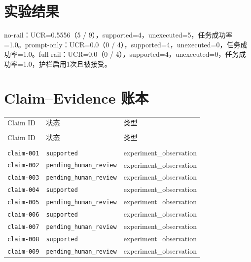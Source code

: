 \documentclass[UTF8]{ctexart}
\begin{document}
\section{实验结果}
no-\allowbreak{}rail：UCR=0.5556（5 / 9），supported=4，unexecuted=5，任务成功率=1.0。prompt-\allowbreak{}only：UCR=0.0（0 / 4），supported=4，unexecuted=0，任务成功率=1.0。full-\allowbreak{}rail：UCR=0.0（0 / 4），supported=4，unexecuted=0，任务成功率=1.0，护栏启用1次且被接受。
\section{Claim--Evidence 账本}
\begin{longtable}{@{}>{\raggedright\arraybackslash}p{}>{\raggedright\arraybackslash}p{}>{\raggedright\arraybackslash}p{}@{}}
\toprule
Claim ID & 状态 & 类型\\\\
\midrule
\endfirsthead
\toprule
Claim ID & 状态 & 类型\\\\
\midrule
\endhead
\texttt{\scriptsize claim-\allowbreak{}001} & \texttt{\scriptsize supported} & experiment\_\allowbreak{}observation \\
\texttt{\scriptsize claim-\allowbreak{}002} & \texttt{\scriptsize pending\_\allowbreak{}human\_\allowbreak{}review} & experiment\_\allowbreak{}observation \\
\texttt{\scriptsize claim-\allowbreak{}003} & \texttt{\scriptsize pending\_\allowbreak{}human\_\allowbreak{}review} & experiment\_\allowbreak{}observation \\
\texttt{\scriptsize claim-\allowbreak{}004} & \texttt{\scriptsize supported} & experiment\_\allowbreak{}observation \\
\texttt{\scriptsize claim-\allowbreak{}005} & \texttt{\scriptsize pending\_\allowbreak{}human\_\allowbreak{}review} & experiment\_\allowbreak{}observation \\
\texttt{\scriptsize claim-\allowbreak{}006} & \texttt{\scriptsize supported} & experiment\_\allowbreak{}observation \\
\texttt{\scriptsize claim-\allowbreak{}007} & \texttt{\scriptsize pending\_\allowbreak{}human\_\allowbreak{}review} & experiment\_\allowbreak{}observation \\
\texttt{\scriptsize claim-\allowbreak{}008} & \texttt{\scriptsize supported} & experiment\_\allowbreak{}observation \\
\texttt{\scriptsize claim-\allowbreak{}009} & \texttt{\scriptsize pending\_\allowbreak{}human\_\allowbreak{}review} & experiment\_\allowbreak{}observation \\

\end{longtable}
\end{document}
